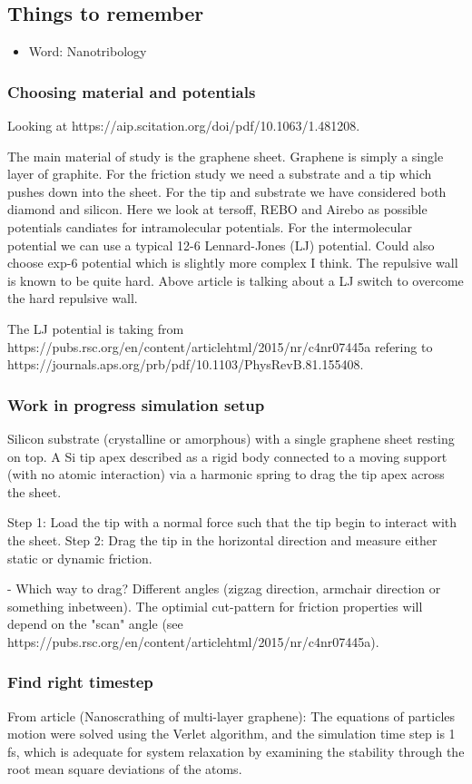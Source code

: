 \subsection*{Things to remember}
\begin{itemize}
    \item Word: Nanotribology
\end{itemize}

\subsubsection*{Choosing material and potentials}

Looking at https://aip.scitation.org/doi/pdf/10.1063/1.481208.

The main material of study is the graphene sheet. Graphene is simply a single layer of graphite. For the friction study we need a substrate and a tip which pushes down into the sheet. For the tip and substrate we have considered both diamond and silicon. Here we look at tersoff, REBO and Airebo as possible potentials candiates for intramolecular potentials. For the intermolecular potential we can use a typical 12-6 Lennard-Jones (LJ) potential. Could also choose exp-6 potential which is slightly more complex I think. The repulsive wall is known to be quite hard. Above article is talking about a LJ switch to overcome the hard repulsive wall.  


The LJ potential is taking from https://pubs.rsc.org/en/content/articlehtml/2015/nr/c4nr07445a refering to https://journals.aps.org/prb/pdf/10.1103/PhysRevB.81.155408.


\subsubsection*{Work in progress simulation setup}
Silicon substrate (crystalline or amorphous) with a single graphene sheet resting on top. A Si tip apex described as a rigid body connected to a moving support (with no atomic interaction) via a harmonic spring to drag the tip apex across the sheet. \par
Step 1: Load the tip with a normal force such that the tip begin to interact with the sheet. Step 2: Drag the tip in the horizontal direction and measure either static or dynamic friction. 

- Which way to drag? Different angles (zigzag direction, armchair direction or something inbetween). The optimial cut-pattern for friction properties will depend on the "scan" angle (see https://pubs.rsc.org/en/content/articlehtml/2015/nr/c4nr07445a). 


\subsubsection*{Find right timestep}
From article (Nanoscrathing of multi-layer graphene): The equations of particles motion were solved using the Verlet algorithm, and the simulation time step is 1 fs, which is adequate for system relaxation by examining the stability through the root mean square deviations of the atoms.